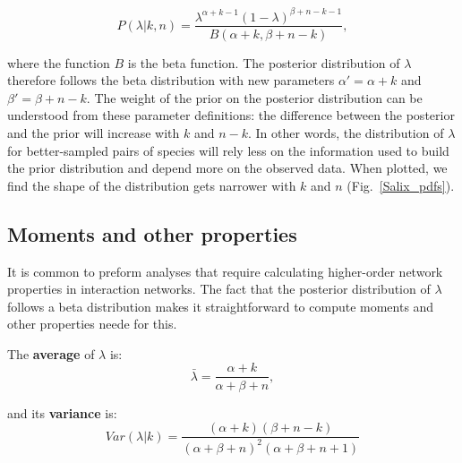 \documentclass[12pt]{article}
\begin{document}
\begin{spacing}{2.0}
      \begin{equation}
        P(\lambda|k,n) = \frac{\lambda^{\alpha+k-1}(1-\lambda)^{\beta+n-k-1}}{B(\alpha+k,\beta+n-k)} , \label{posterior}
      \end{equation}

      
      \noindent where the function $B$ is the beta function. The posterior distribution of $\lambda$ therefore follows the beta distribution with new parameters $\alpha'= \alpha+k$ and $\beta'=\beta+n-k$. The weight of the prior on the posterior distribution can be understood from these parameter definitions: the difference between the posterior and the prior will increase with $k$ and $n-k$. In other words, the distribution of $\lambda$ for better-sampled pairs of species will rely less on the information used to build the prior distribution and depend more on the observed data.
      When plotted, we find the shape of the distribution gets narrower with $k$ and $n$ (Fig.~\ref{Salix_pdfs}). 



    \subsection*{Moments and other properties}

      It is common to preform analyses that require calculating higher-order network properties in interaction networks. The fact that the posterior distribution of $\lambda$ follows a beta distribution makes it straightforward to compute moments and other properties neede for this. 

      The \textbf{average} of $\lambda$ is: 
          \begin{equation}
            \bar{\lambda} = \frac{\alpha+k}{\alpha+\beta+n} ,
            \label{mean}
          \end{equation}

        and its \textbf{variance} is:  
          \begin{equation}
            Var(\lambda|k) = \frac{(\alpha + k)(\beta + n - k)}{(\alpha + \beta + n)^{2}(\alpha + \beta + n +1)}
            \label{variance}
          \end{equation}


\end{spacing}
\end{document}
